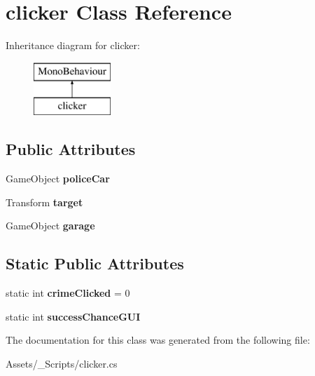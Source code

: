 \hypertarget{classclicker}{}\section{clicker Class Reference}
\label{classclicker}
Inheritance diagram for clicker\+:\begin{figure}[H]
\begin{center}
\leavevmode
\includegraphics[height=2.000000cm]{classclicker}
\end{center}
\end{figure}
\subsection*{Public Attributes}
\begin{DoxyCompactItemize}
\item 
\hypertarget{classclicker_a22e9b7046b7f47f3bbcb928615f833b6}{}Game\+Object {\bfseries police\+Car}\label{classclicker_a22e9b7046b7f47f3bbcb928615f833b6}

\item 
\hypertarget{classclicker_a13451e7e1c0c4920c7f5a1ecf8f016ee}{}Transform {\bfseries target}\label{classclicker_a13451e7e1c0c4920c7f5a1ecf8f016ee}

\item 
\hypertarget{classclicker_a338a906d61a23e315a4d073faf9e1de9}{}Game\+Object {\bfseries garage}\label{classclicker_a338a906d61a23e315a4d073faf9e1de9}

\end{DoxyCompactItemize}
\subsection*{Static Public Attributes}
\begin{DoxyCompactItemize}
\item 
\hypertarget{classclicker_a83c717841ba9faef75c0ca80671e6b03}{}static int {\bfseries crime\+Clicked} = 0\label{classclicker_a83c717841ba9faef75c0ca80671e6b03}

\item 
\hypertarget{classclicker_a47bc3c4c4fe624aec1d6726433282fa0}{}static int {\bfseries success\+Chance\+G\+U\+I}\label{classclicker_a47bc3c4c4fe624aec1d6726433282fa0}

\end{DoxyCompactItemize}


The documentation for this class was generated from the following file\+:\begin{DoxyCompactItemize}
\item 
Assets/\+\_\+\+Scripts/clicker.\+cs\end{DoxyCompactItemize}
